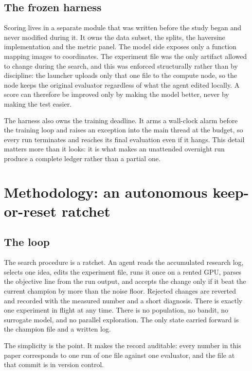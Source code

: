 \documentclass[11pt,a4paper]{article}
\begin{document}
\subsection{The frozen harness}
\label{sec:harness}

Scoring lives in a separate module that was written before the study began and never
modified during it. It owns the data subset, the splits, the haversine implementation and
the metric panel. The model side exposes only a function mapping images to coordinates. The
experiment file was the only artifact allowed to change during the search, and this was
enforced structurally rather than by discipline: the launcher uploads only that one file to
the compute node, so the node keeps the original evaluator regardless of what the agent
edited locally. A score can therefore be improved only by making the model better, never by
making the test easier.

The harness also owns the training deadline. It arms a wall-clock alarm before the training
loop and raises an exception into the main thread at the budget, so every run terminates and
reaches its final evaluation even if it hangs. This detail matters more than it looks: it is
what makes an unattended overnight run produce a complete ledger rather than a partial
one.

\section{Methodology: an autonomous keep-or-reset ratchet}

\subsection{The loop}

The search procedure is a ratchet. An agent reads the accumulated research log, selects one
idea, edits the experiment file, runs it once on a rented GPU, parses the objective line from
the run output, and accepts the change only if it beat the current champion by more than the
noise floor. Rejected changes are reverted and recorded with the measured number and a short
diagnosis. There is exactly one experiment in flight at any time. There is no population, no
bandit, no surrogate model, and no parallel exploration. The only state carried
forward is the champion file and a written log.

The simplicity is the point. It makes the record auditable: every number in this paper
corresponds to one run of one file against one evaluator, and the file at that commit is in
version control.
\end{document}
